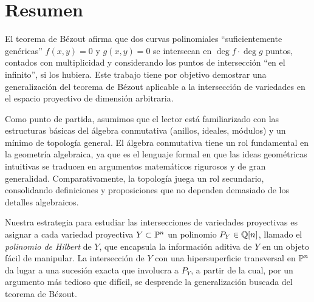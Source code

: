 \chapter*{Resumen}

\noindent El teorema de Bézout afirma que dos curvas polinomiales ``suficientemente genéricas'' $f(x,y) = 0$ y $g(x,y) = 0$ se intersecan en $\deg f \cdot \deg g$ puntos, contados con multiplicidad y considerando los puntos de intersección ``en el infinito'', si los hubiera. Este trabajo tiene por objetivo demostrar una generalización del teorema de Bézout aplicable a la intersección de variedades en el espacio proyectivo de dimensión arbitraria.

Como punto de partida, asumimos que el lector está familiarizado con las estructuras básicas del álgebra conmutativa (anillos, ideales, módulos) y un mínimo de topología general. El álgebra conmutativa tiene un rol fundamental en la geometría algebraica, ya que es el lenguaje formal en que las ideas geométricas intuitivas se traducen en argumentos matemáticos rigurosos y de gran generalidad. Comparativamente, la topología juega un rol secundario, consolidando definiciones y proposiciones que no dependen demasiado de los detalles algebraicos.

Nuestra estrategia para estudiar las intersecciones de variedades proyectivas es asignar a cada variedad proyectiva $Y \subset \P^n$ un polinomio $P_Y \in \Q[n]$, llamado el \textit{polinomio de Hilbert} de $Y$, que encapsula la información aditiva de $Y$ en un objeto fácil de manipular. La intersección de $Y$ con una hipersuperficie transversal en $\P^n$ da lugar a una sucesión exacta que involucra a $P_Y$, a partir de la cual, por un argumento más tedioso que difícil, se desprende la generalización buscada del teorema de Bézout.
